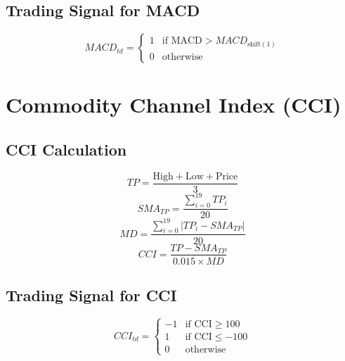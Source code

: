 \documentclass{article}
\begin{document}
\subsection{Trading Signal for MACD}
\begin{equation}
MACD_{td} = 
\begin{cases} 
1 & \text{if MACD} > MACD_{\text{shift}(1)} \\
0 & \text{otherwise}
\end{cases}
\end{equation}

\section{Commodity Channel Index (CCI)}

\subsection{CCI Calculation}
\begin{equation}
TP = \frac{\text{High} + \text{Low} + \text{Price}}{3}
\end{equation}
\begin{equation}
SMA_{TP} = \frac{\sum_{i=0}^{19} TP_i}{20}
\end{equation}
\begin{equation}
MD = \frac{\sum_{i=0}^{19} \left| TP_i - SMA_{TP} \right|}{20}
\end{equation}
\begin{equation}
CCI = \frac{TP - SMA_{TP}}{0.015 \times MD}
\end{equation}

\subsection{Trading Signal for CCI}
\begin{equation}
CCI_{td} = 
\begin{cases} 
-1 & \text{if CCI} \geq 100 \\
1 & \text{if CCI} \leq -100 \\
0 & \text{otherwise}
\end{cases}
\end{equation}
\end{document}
